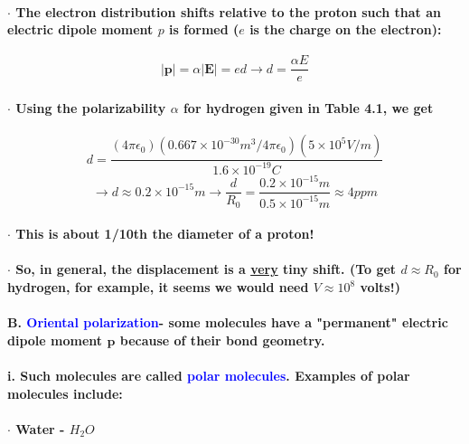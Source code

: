 \documentclass{article}
\begin{document}
\paragraph{\indent $\cdot$ The electron distribution shifts relative to the proton such that an electric dipole moment $p$ is formed ($e$ is the charge on the electron):}
\begin{equation*}
    |\boldsymbol{p}|=\alpha|\boldsymbol{E}|=ed\rightarrow d=\frac{\alpha E}{e}
\end{equation*}
\paragraph{\indent $\cdot$ Using the polarizability $\alpha$ for hydrogen given in Table 4.1, we get }
\begin{equation*}
    d=\frac{(4\pi\epsilon_0)(0.667\times 10^{-30}m^3/4\pi\epsilon_0)(5\times10^5 V/m)}{1.6\times 10^{-19} C}
\end{equation*}
\begin{equation*}
    \rightarrow d \approx 0.2\times 10^{-15}m \rightarrow \frac{d}{R_0}=\frac{0.2\times 10^{-15}m}{0.5\times 10^{-15}m} \approx 4ppm
\end{equation*}
\paragraph{\indent $\cdot$ This is about 1/10th the diameter of a proton!}
\paragraph{\indent $\cdot$ So, in general, the displacement is a \underline{very} tiny shift. (To get $d\approx R_0$ for hydrogen, for example, it seems we would need $V\approx 10^8$ volts!)}
\paragraph{B. \textcolor{blue}{Oriental polarization}- some molecules have a "permanent" electric dipole moment $\boldsymbol{p}$ because of their bond geometry.}
\paragraph{\indent i. Such molecules are called \textcolor{blue}{polar molecules}. Examples of polar molecules include:}
\paragraph{\indent $\cdot$ Water - $H_2O$}
\end{document}
